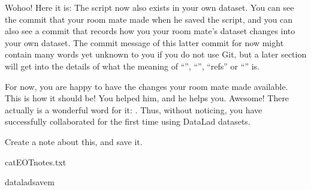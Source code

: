 \sphinxAtStartPar
Wohoo! Here it is: The script now also exists in your own dataset.
You can see the commit that your room mate made when he saved the script,
and you can also see a commit that records how you  your
room mate’s dataset changes into your own dataset. The commit message of this
latter commit for now might contain many words yet unknown to you if you
do not use Git, but a later section will get into the details of what
the meaning of “{\hyperref[\detokenize{glossary:term-merge}]{}}”, “{\hyperref[\detokenize{glossary:term-branch}]{}}”, “refs”
or “{\hyperref[\detokenize{glossary:term-main}]{}}” is.

\sphinxAtStartPar
For now, you are happy to have the changes your room mate made available.
This is how it should be! You helped him, and he helps you. Awesome!
There actually is a wonderful word for it: .
Thus, without noticing, you have successfully collaborated for the first
time using DataLad datasets.

\sphinxAtStartPar
Create a note about this, and save it.

\begin{sphinxVerbatim}[commandchars=\\\{\}]
cat\PYGZlt{}\PYGZlt{}EOT\PYGZgt{}\PYGZgt{}notes.txt

dataladsave\PYGZhy{}m
\end{sphinxVerbatim}

\sphinxstepscope



